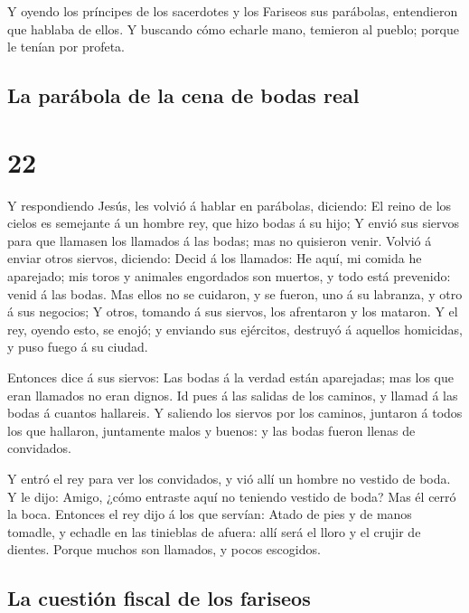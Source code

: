  Y oyendo los príncipes de los sacerdotes y los Fariseos
sus parábolas, entendieron que hablaba de ellos.  Y
buscando cómo echarle mano, temieron al pueblo; porque le tenían por
profeta.

\hypertarget{la-paruxe1bola-de-la-cena-de-bodas-real}{%
\subsection{La parábola de la cena de bodas
real}\label{la-paruxe1bola-de-la-cena-de-bodas-real}}

\hypertarget{section-40-22}{%
\section{22}\label{section-40-22}}

 Y respondiendo Jesús, les volvió á hablar en parábolas,
diciendo:  El reino de los cielos es semejante á un hombre
rey, que hizo bodas á su hijo;  Y envió sus siervos para
que llamasen los llamados á las bodas; mas no quisieron venir.
 Volvió á enviar otros siervos, diciendo: Decid á los
llamados: He aquí, mi comida he aparejado; mis toros y animales
engordados son muertos, y todo está prevenido: venid á las bodas.
 Mas ellos no se cuidaron, y se fueron, uno á su labranza,
y otro á sus negocios;  Y otros, tomando á sus siervos,
los afrentaron y los mataron.  Y el rey, oyendo esto, se
enojó; y enviando sus ejércitos, destruyó á aquellos homicidas, y puso
fuego á su ciudad.

 Entonces dice á sus siervos: Las bodas á la verdad están
aparejadas; mas los que eran llamados no eran dignos.  Id
pues á las salidas de los caminos, y llamad á las bodas á cuantos
hallareis.  Y saliendo los siervos por los caminos,
juntaron á todos los que hallaron, juntamente malos y buenos: y las
bodas fueron llenas de convidados.

 Y entró el rey para ver los convidados, y vió allí un
hombre no vestido de boda.  Y le dijo: Amigo, ¿cómo
entraste aquí no teniendo vestido de boda? Mas él cerró la boca.
 Entonces el rey dijo á los que servían: Atado de pies y
de manos tomadle, y echadle en las tinieblas de afuera: allí será el
lloro y el crujir de dientes.  Porque muchos son
llamados, y pocos escogidos.

\hypertarget{la-cuestiuxf3n-fiscal-de-los-fariseos}{%
\subsection{La cuestión fiscal de los
fariseos}\label{la-cuestiuxf3n-fiscal-de-los-fariseos}}


